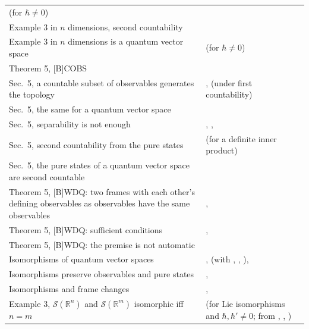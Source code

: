 \documentclass[11pt]{article}
\begin{document}
\begin{xltabular}{\textwidth}{@{}BL@{}}
   (for $\hbar \ne 0$) \\
Example 3 in $n$ dimensions, second countability &  \\
Example 3 in $n$ dimensions is a quantum vector space & 
  (for $\hbar \ne 0$) \\
Theorem 5, [B]COBS &  \\
Sec.~5, a countable subset of observables generates the topology &
  ,  (under first
  countability) \\
Sec.~5, the same for a quantum vector space &  \\
Sec.~5, separability is not enough & ,
  ,  \\
Sec.~5, second countability from the pure states &
   (for a definite inner product) \\
Sec.~5, the pure states of a quantum vector space are second countable &
   \\
Theorem 5, [B]WDQ: two frames with each other's defining observables as observables have the
  same observables & ,  \\
Theorem 5, [B]WDQ: sufficient conditions & ,
   \\
Theorem 5, [B]WDQ: the premise is not automatic &  \\
Isomorphisms of quantum vector spaces & ,  (with
  , , ),  \\
Isomorphisms preserve observables and pure states & ,
   \\
Isomorphisms and frame changes & ,
   \\
Example 3, $\mathcal{S}(\mathbb{R}^n)$ and $\mathcal{S}(\mathbb{R}^m)$ isomorphic iff $n = m$ &
   (for Lie isomorphisms and $\hbar, \hbar' \ne 0$; from
  , ,
  ) \\
\bottomrule
\end{xltabular}
\end{document}
